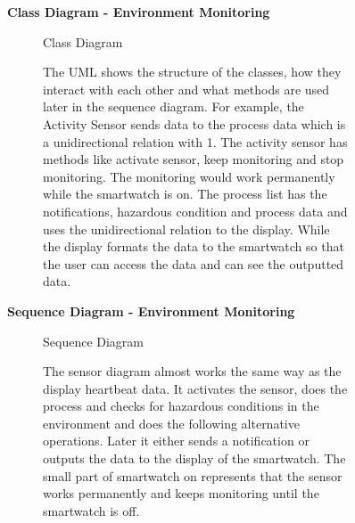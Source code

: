 \documentclass{article}
\begin{document}
	\clearpage
	\begin{figure}[htbp]
		\textbf{Class Diagram - Environment Monitoring}
		\centering
		\begin{subfigure}{\textwidth}
			\resizebox{\textwidth}{!}{}
			\caption{Class Diagram}
		\end{subfigure}
		\begin{subfigure}{\textwidth}
			The UML shows the structure of the classes, how they interact with each other and what methods are 
			used later in the sequence diagram. For example, the Activity Sensor sends data to the process data 
			which is a unidirectional relation with 1. The activity sensor has methods like activate sensor, keep 
			monitoring and stop monitoring. The monitoring would work permanently while the smartwatch is on. The 
			process list has the notifications, hazardous condition and process data and uses the unidirectional 
			relation to the display. While the display formats the data to the smartwatch so that the user can access 
			the data and can see the outputted data. 
		\end{subfigure}
	\end{figure}
	\clearpage

	\begin{figure}[htbp]
		\textbf{Sequence Diagram - Environment Monitoring}
		\centering
		\begin{subfigure}{\textwidth}
			\resizebox{\textwidth}{!}{}
			\caption{Sequence Diagram}
		\end{subfigure}
		\begin{subfigure}{\textwidth}
			The sensor diagram almost works the same way as the display heartbeat data. It activates the sensor, 
			does the process and checks for hazardous conditions in the environment and does the following alternative
			operations. Later it either sends a notification or outputs the data to the display of the smartwatch. 
			The small part of smartwatch on represents that the sensor works permanently and keeps monitoring until 
			the smartwatch is off. 
		\end{subfigure}
	\end{figure}
	\clearpage
\end{document}
